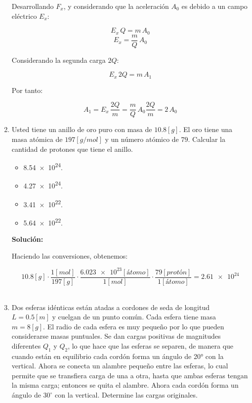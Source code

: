 \documentclass[letter,11pt]{article}
\begin{document}
\begin{enumerate}
Desarrollando $F_x$, y considerando que la aceleración $A_0$ es debido a un
campo eléctrico $E_x$:

\begin{equation*}
    E_x\,Q = m\,A_0
\end{equation*}
\begin{equation*}
    E_x = \frac{m}{Q}\,A_0
\end{equation*}

Considerando la segunda carga $2Q$:

\begin{equation*}
    E_x\,2Q = m\,A_1
\end{equation*}

Por tanto:

\begin{equation*}
    A_1 = E_x\,\frac{2Q}{m} = \frac{m}{Q}\,A_0 \frac{2Q}{m} = 2\,A_0
\end{equation*}

\item Usted tiene un anillo de oro puro con masa de $10.8 [g]$. El oro tiene una
masa atómica de $197 [g/mol]$ y un número atómico de $79$. Calcular la cantidad
de protones que tiene el anillo.

\begin{itemize}
    \item \num{8.54e24}.
    \item \num{4.27e24}.
    \item \num{3.41e22}.
    \item \num{5.64e22}.
\end{itemize}

\textbf{Solución:}

Haciendo las conversiones, obtenemos:

\begin{equation*}
    10.8 [g] \cdot
    \frac{1 [mol]}{197 [g]} \cdot
    \frac{\num{6.023e23}[átomo]}{1 [mol]} \cdot
    \frac{79 [protón]}{1 [átomo]} = \num{2.61e24}
\end{equation*}
\\

\item Dos esferas idénticas están atadas a cordones de seda de longitud
$L = 0.5 [m]$ y cuelgan de un punto común. Cada esfera tiene masa $m =8 [g]$. El
radio de cada esfera es muy pequeño por lo que pueden considerarse masas
puntuales. Se dan cargas positivas de magnitudes diferentes $Q_1$ y $Q_2$, lo
que hace que las esferas se separen, de manera que cuando están en equilibrio
cada cordón forma un ángulo de 20° con la vertical. Ahora se conecta un alambre
pequeño entre las esferas, lo cual permite que se transfiera carga de una a
otra, hasta que ambas esferas tengan la misma carga; entonces se quita el
alambre. Ahora cada cordón forma un ángulo de $30^\circ$ con la vertical.
Determine las cargas originales.


\end{enumerate}
\end{document}
